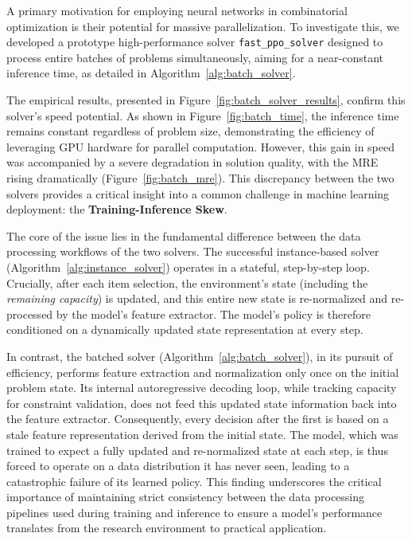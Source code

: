 A primary motivation for employing neural networks in combinatorial optimization is their potential for massive parallelization. To investigate this, we developed a prototype high-performance solver \texttt{fast\_ppo\_solver} designed to process entire batches of problems simultaneously, aiming for a near-constant inference time, as detailed in Algorithm~\ref{alg:batch_solver}.

The empirical results, presented in Figure~\ref{fig:batch_solver_results}, confirm this solver's speed potential. As shown in Figure~\ref{fig:batch_time}, the inference time remains constant regardless of problem size, demonstrating the efficiency of leveraging GPU hardware for parallel computation. However, this gain in speed was accompanied by a severe degradation in solution quality, with the MRE rising dramatically (Figure~\ref{fig:batch_mre}). This discrepancy between the two solvers provides a critical insight into a common challenge in machine learning deployment: the \textbf{Training-Inference Skew}.

The core of the issue lies in the fundamental difference between the data processing workflows of the two solvers. The successful instance-based solver (Algorithm~\ref{alg:instance_solver}) operates in a stateful, step-by-step loop. Crucially, after each item selection, the environment's state (including the \textit{remaining capacity}) is updated, and this entire new state is re-normalized and re-processed by the model's feature extractor. The model's policy is therefore conditioned on a dynamically updated state representation at every step.

In contrast, the batched solver (Algorithm~\ref{alg:batch_solver}), in its pursuit of efficiency, performs feature extraction and normalization only once on the initial problem state. Its internal autoregressive decoding loop, while tracking capacity for constraint validation, does not feed this updated state information back into the feature extractor. Consequently, every decision after the first is based on a stale feature representation derived from the initial state. The model, which was trained to expect a fully updated and re-normalized state at each step, is thus forced to operate on a data distribution it has never seen, leading to a catastrophic failure of its learned policy. This finding underscores the critical importance of maintaining strict consistency between the data processing pipelines used during training and inference to ensure a model's performance translates from the research environment to practical application.

